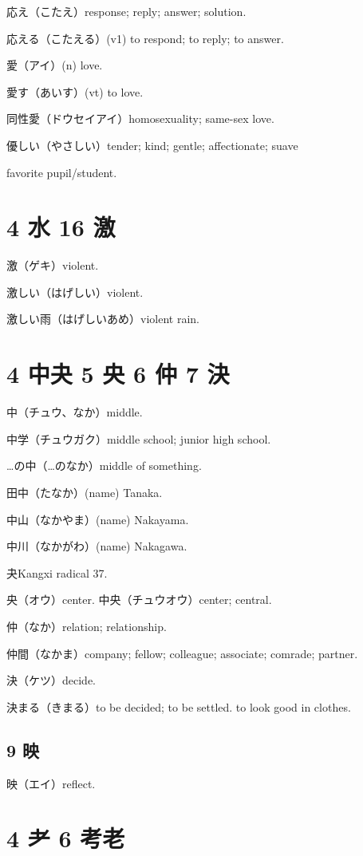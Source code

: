 応え（こたえ）response; reply; answer; solution.

応える（こたえる）(v1) to respond; to reply; to answer.

愛（アイ）(n) love.

愛す（あいす）(vt) to love.

同性愛（ドウセイアイ）homosexuality; same-sex love.

優しい（やさしい）tender; kind; gentle; affectionate; suave

favorite pupil/student.

\section{4 水 16 激}

激（ゲキ）violent.

激しい（はげしい）violent.

激しい雨（はげしいあめ）violent rain.

\section{4 中夬 5 央 6 仲 7 決}

中（チュウ、なか）middle.

中学（チュウガク）middle school; junior high school.

…の中（…のなか）middle of something.

田中（たなか）(name) Tanaka.

中山（なかやま）(name) Nakayama.

中川（なかがわ）(name) Nakagawa.

夬Kangxi radical 37.

央（オウ）center.
中央（チュウオウ）center; central.

仲（なか）relation; relationship.

仲間（なかま）company; fellow; colleague; associate; comrade; partner.

決（ケツ）decide.

決まる（きまる）to be decided; to be settled. to look good in clothes.

\subsection{9 映}

映（エイ）reflect.

\section{4 耂 6 考老}

